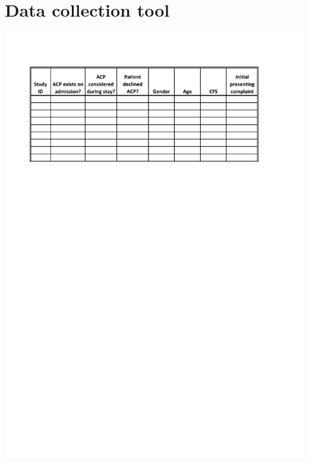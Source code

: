 \documentclass
[
	12pt,
	a4paper,
	oneside,
]{report}
\begin{document}
\chapter{Data collection tool}
\label{apx:tool}
\includegraphics[width=\textwidth]{dataCollection}


\end{document}
